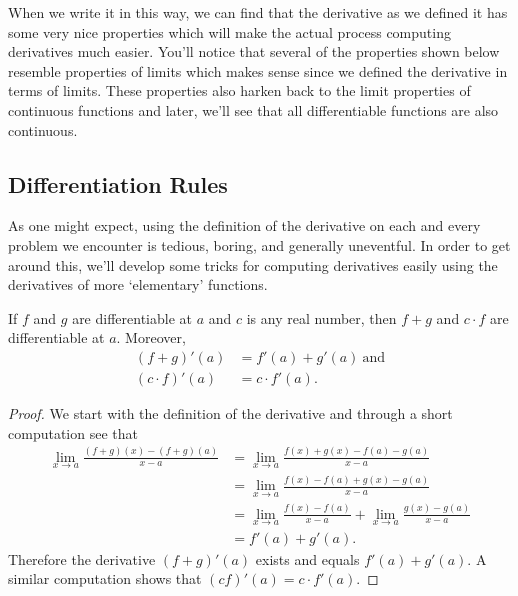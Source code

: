 When we write it in this way, we can find that the derivative as we defined it has some very nice properties which will make the actual process computing derivatives much easier. You'll notice that several of the properties shown below resemble properties of limits which makes sense since we defined the derivative in terms of limits. These properties also harken back to the limit properties of continuous functions and later, we'll see that all differentiable functions are also continuous.

\subsection{Differentiation Rules}


As one might expect, using the definition of the derivative on each and every problem we encounter is tedious, boring, and generally uneventful. In order to get around this, we'll develop some tricks for computing derivatives easily using the derivatives of more `elementary' functions.

\begin{prop}\label{SMultSumDiff}
	If $f$ and $g$ are differentiable at $a$ and  $c$ is any real number, then $f+g$ and $c\cdot f$ are differentiable at $a$. Moreover,
	\begin{align}
		 (f+g)'(a)&=f'(a)+g'(a)\ \text{and}\\
		  (c\cdot f)'(a)&=c\cdot f'(a).
	\end{align}
\end{prop}
\begin{proof}
We start with the definition of the derivative and through a short computation see that
\begin{align*}
	\lim\limits_{x\to a}\frac{(f+g)(x)-(f+g)(a)}{x-a}&=	\lim\limits_{x\to a}\frac{f(x) +g(x)-f(a)-g(a)}{x-a}\\
	&=\lim\limits_{x\to a}\frac{f(x)-f(a)+g(x)-g(a)}{x-a}\\
	&=\lim\limits_{x\to a}\frac{f(x)-f(a)}{x-a}+\lim\limits_{x\to a}\frac{g(x)-g(a)}{x-a}\\
	&=f'(a)+g'(a).
\end{align*}
Therefore the derivative $(f+g)'(a)$ exists and equals $f'(a)+g'(a)$. A similar computation shows that $(cf)'(a)=c\cdot f'(a)$.
\end{proof}

